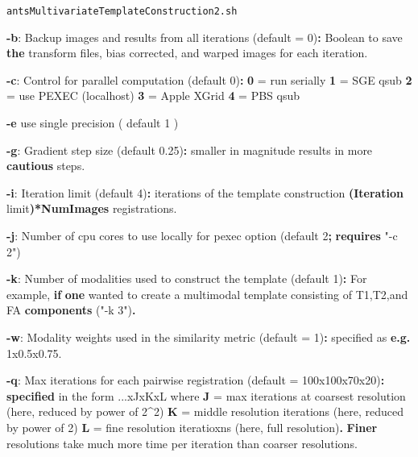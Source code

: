 \documentclass[ignorenonframetext,]{beamer}
\newenvironment{Shaded}{\begin{snugshade}}{\end{snugshade}}
\newcommand{\KeywordTok}[1]{\textcolor[rgb]{0.13,0.29,0.53}{\textbf{{#1}}}}
\newcommand{\StringTok}[1]{\textcolor[rgb]{0.31,0.60,0.02}{{#1}}}
\newcommand{\NormalTok}[1]{{#1}}
\begin{document}
\begin{frame}[fragile]{\texttt{antsMultivariateTemplateConstruction2.sh}}
\begin{Shaded}
\begin{Highlighting}[]
     \KeywordTok{-b}\NormalTok{:  Backup images and results from all iterations (default = 0)}\KeywordTok{:}  \NormalTok{Boolean to save}
          \KeywordTok{the} \NormalTok{transform files, bias corrected, and warped images for each iteration.}

     \KeywordTok{-c}\NormalTok{:  Control for parallel computation (default 0)}\KeywordTok{:}
          \KeywordTok{0} \NormalTok{= run serially}
          \KeywordTok{1} \NormalTok{= SGE qsub}
          \KeywordTok{2} \NormalTok{= use PEXEC (localhost)}
          \KeywordTok{3} \NormalTok{= Apple XGrid}
          \KeywordTok{4} \NormalTok{= PBS qsub}

     \KeywordTok{-e}   \NormalTok{use single precision ( default 1 )}

     \KeywordTok{-g}\NormalTok{:  Gradient step size (default 0.25)}\KeywordTok{:} \NormalTok{smaller in magnitude results in more}
          \KeywordTok{cautious} \NormalTok{steps.}

     \KeywordTok{-i}\NormalTok{:  Iteration limit (default 4)}\KeywordTok{:} \NormalTok{iterations of the template construction}
          \KeywordTok{(Iteration} \NormalTok{limit}\KeywordTok{)*NumImages} \NormalTok{registrations.}

     \KeywordTok{-j}\NormalTok{:  Number of cpu cores to use locally for pexec option (default 2}\KeywordTok{;} \KeywordTok{requires} \StringTok{"-c 2"}\NormalTok{)}

     \KeywordTok{-k}\NormalTok{:  Number of modalities used to construct the template (default 1)}\KeywordTok{:}  \NormalTok{For example,}
          \KeywordTok{if} \KeywordTok{one} \NormalTok{wanted to create a multimodal template consisting of T1,T2,and FA}
          \KeywordTok{components} \NormalTok{(}\StringTok{"-k 3"}\NormalTok{)}\KeywordTok{.}

     \KeywordTok{-w}\NormalTok{:  Modality weights used in the similarity metric (default = 1)}\KeywordTok{:} \NormalTok{specified as}
          \KeywordTok{e.g.} \NormalTok{1x0.5x0.75.}

     \KeywordTok{-q}\NormalTok{:  Max iterations for each pairwise registration (default = 100x100x70x20)}\KeywordTok{:}
          \KeywordTok{specified} \NormalTok{in the form ...xJxKxL where}
            \KeywordTok{J} \NormalTok{= max iterations at coarsest resolution (here, reduced by power of 2^2)}
            \KeywordTok{K} \NormalTok{= middle resolution iterations (here, reduced by power of 2)}
            \KeywordTok{L} \NormalTok{= fine resolution iteratioxns (here, full resolution)}\KeywordTok{.}
          \KeywordTok{Finer} \NormalTok{resolutions take much more time per iteration than coarser resolutions.}


\end{Highlighting}
\end{Shaded}
\end{frame}
\end{document}
